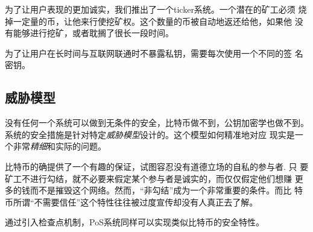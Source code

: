\documentclass[letterpaper]{article}
\begin{document}
为了让用户表现的更加诚实，我们推出了一个ticker系统。一个潜在的矿工必须
烧掉一定量的币，让他来行使挖矿权。这个数量的币被自动地返还给他，如果他
没有能够进行挖矿，或者耽搁了很长一段时间。

为了让用户在长时间与互联网联通时不暴露私钥，需要每次使用一个不同的签
名密钥。

\subsection{威胁模型}
没有任何一个系统可以做到无条件的安全，比特币做不到，公钥加密学也做不到。
系统的安全措施是针对特定\emph{威胁模型}设计的。这个模型如何精准地对应
现实是一个非常\emph{精细}和实际的问题。

比特币的确提供了一个有趣的保证，试图容忍没有道德立场的自私的参与者. 只
要矿工不进行勾结，就不必要来假定某个参与者是诚实的，而仅仅假定他们想赚
更多的钱而不是摧毁这个网络。然而，“非勾结”成为一个非常重要的条件。而比
特币所谓``不需要信任''这个特性往往被过度宣传却没有人真正去了解。

通过引入检查点机制，PoS系统同样可以实现类似比特币的安全特性。
\end{document}

